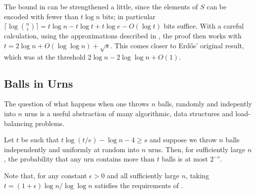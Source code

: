 \documentclass[lotsofwhite]{patmorin}
\begin{document}
\begin{rem}
The bound in  can be strengthened a little,
since the elements of $S$ can be encoded with fewer than $t\log n$
bits; in particular $\lceil\log\binom{n}{t}\rceil=t\log n - t\log t +
t\log e - O(\log t)$ bits suffice.  With a careful calculation, using
the approximations described in , the
proof then works with $t=2\log n +O(\log\log n) + \sqrt{s}$. This comes
closer to Erdős' original result, which was at the threshold $2\log n -
2\log\log n + O(1)$.
\end{rem}



\subsection{Balls in Urns}

The question of what happens when one throws $n$ balls, randomly and
indepently into $n$ urns is a useful abstraction of many algorithmic,
data structures and load-balancing problems.

\begin{thm}
  Let $t$ be such that $t\log(t/e)-\log n-4 \ge s$ and suppose we throw
  $n$ balls independently and uniformly at random into $n$ urns. Then,
  for sufficiently large $n$, the probability that any urn contains more 
  than $t$ balls is at most $2^{-s}$.
\end{thm}

Note that, for any constant $\epsilon >0$ and all sufficiently large
$n$, taking $t = (1+\epsilon)\log n/\log\log n$ satisfies the requirements
of .
\end{document}
